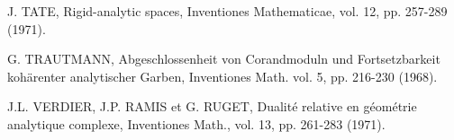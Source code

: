 
J. TATE, Rigid-analytic spaces, Inventiones Mathematicae, vol. 12, pp. 257-289
(1971).

G. TRAUTMANN, Abgeschlossenheit von Corandmoduln und Fortsetzbarkeit kohärenter
analytischer Garben, Inventiones Math. vol. 5, pp. 216-230 (1968).

J.L. VERDIER, J.P. RAMIS et G. RUGET, Dualité relative en géométrie analytique
complexe, Inventiones Math., vol. 13, pp. 261-283 (1971).

